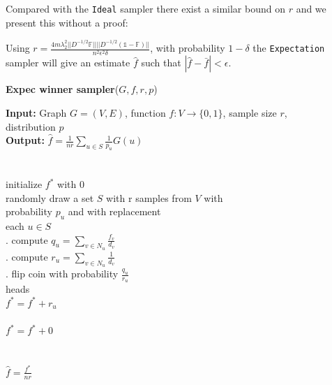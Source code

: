 Compared with the \texttt{Ideal} sampler there exist a similar bound on $r$ and we present this without a proof:
\begin{theorem}
Using $r = \frac{4m\lambda_2^2||D^{-1/2}\mathds{F}||||D^{-1/2}(\mathds{1}-\mathds{F})||}{n^2\epsilon^2\delta}$, with probability $1-\delta$ the \texttt{Expectation} sampler will give an estimate $\hat{f}$ such that $|\hat{f}-\bar{f}|< \epsilon$.  
\end{theorem}
\begin{algorithm*}[!htb]
\caption{\small {\bf Expec winner sampler}($G, f, r, p$)}
\begin{code}
{\bf Input:} Graph $G=(V,E)$, function $f : V \rightarrow \{0,1\}$, sample size $r$,\\ distribution $p$ \\
{\bf Output:} $\hat{f}=\frac{1}{nr}\sum\nolimits_{u\in S}\frac{1}{p_u}G(u)$\\
\\
\uln \>\ubegin\\
\uln \>\>initialize $f^*$ with 0 \\
\uln \>\>randomly draw a set $S$ with r samples from $V$ with\\
\>   \>\>probability $p_u$ and with replacement\\
\uln \>\>\ufor each $u \in S$ \udo\\
\uln \>\>. compute $q_u = \sum_{v\in N_u}\frac{f_v}{d_v}$\\
\>   \>\>. compute $r_u = \sum_{v\in N_u}\frac{1}{d_v}$\\
\>   \>\>. flip coin with probability $\frac{q_u}{r_u}$\\
\uln \>\>\>\uif heads\\
\uln \>\>\>\>$f^* = f^* + r_u$ \\
\uln \>\>\>\uelse\\
\uln \>\>\>\>$f^* = f^* + 0$ \\
\uln \>\>\>\uend\\
\uln \>\>\uend\\
\uln \>\ureturn $\hat{f} = \frac{f^*}{nr}$ \\
\uln \>\uend\\ 
\end{code}
\label{algexpec}
\end{algorithm*}
